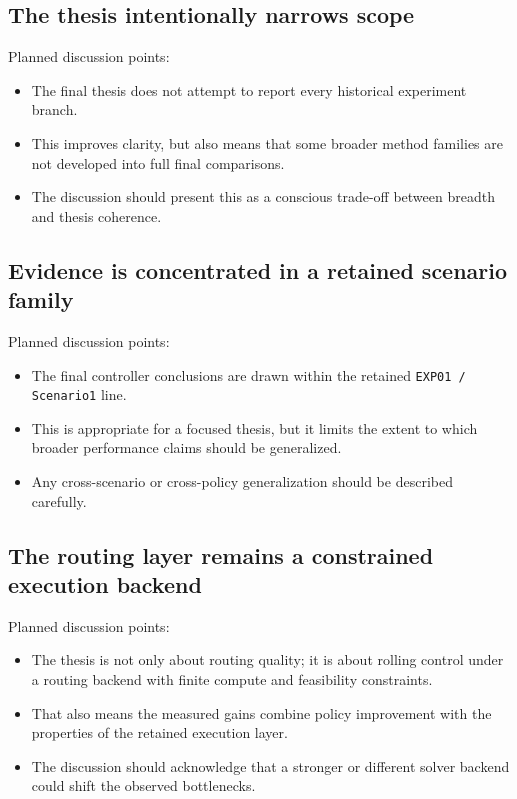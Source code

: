 \subsection{The thesis intentionally narrows scope}

Planned discussion points:
\begin{itemize}
    \item The final thesis does not attempt to report every historical experiment branch.
    \item This improves clarity, but also means that some broader method families are not developed into full final comparisons.
    \item The discussion should present this as a conscious trade-off between breadth and thesis coherence.
\end{itemize}

\subsection{Evidence is concentrated in a retained scenario family}

Planned discussion points:
\begin{itemize}
    \item The final controller conclusions are drawn within the retained \texttt{EXP01 / Scenario1} line.
    \item This is appropriate for a focused thesis, but it limits the extent to which broader performance claims should be generalized.
    \item Any cross-scenario or cross-policy generalization should be described carefully.
\end{itemize}

\subsection{The routing layer remains a constrained execution backend}

Planned discussion points:
\begin{itemize}
    \item The thesis is not only about routing quality; it is about rolling control under a routing backend with finite compute and feasibility constraints.
    \item That also means the measured gains combine policy improvement with the properties of the retained execution layer.
    \item The discussion should acknowledge that a stronger or different solver backend could shift the observed bottlenecks.
\end{itemize}

